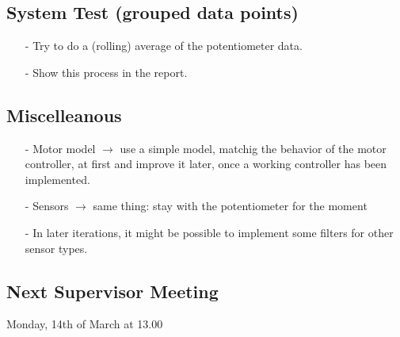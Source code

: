 \subsection{System Test (grouped data points)}
\begin{itemize}
  \item[-] Try to do a (rolling) average of the potentiometer data.
  \item[-] Show this process in the report.
\end{itemize}

\subsection{Miscelleanous}
\begin{itemize}
  \item[-] Motor model $\rightarrow$ use a simple model, matchig the behavior of the motor controller, at first and improve it later, once a working controller has been implemented.
  \item[-] Sensors $\rightarrow$ same thing: stay with the potentiometer for the moment
  \item[-] In later iterations, it might be possible to implement some filters for other sensor types.
\end{itemize}

\subsection{Next Supervisor Meeting}
Monday, 14th of March at 13.00




